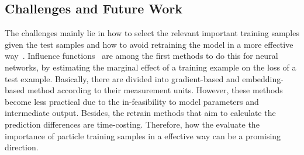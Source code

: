 \subsection{Challenges and Future Work}
The challenges mainly lie in how to select the relevant important training samples given the test samples and how to avoid retraining the model in a more effective way~\cite{}. Influence functions~\cite{hampel1974influence,DBLP:conf/icml/KohL17,DBLP:conf/nips/PruthiLKS20} are among the first methods to do this for neural networks, by estimating the marginal effect of a training example on the loss of a test example. Basically, there are divided into gradient-based and embedding-based method according to  their measurement units. However, these methods become less practical due to the in-feasibility to model parameters and intermediate output. Besides, the retrain methods that aim to calculate the prediction differences are time-costing. Therefore, how the evaluate the importance of particle training samples in a effective way can be a promising direction.


